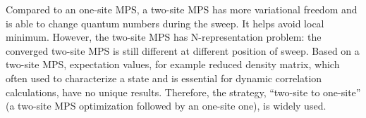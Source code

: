 Compared to an one-site MPS, a two-site MPS has more variational freedom and is able to change quantum numbers during the sweep. It helps avoid local minimum. However, the two-site MPS has N-representation problem: the converged two-site MPS is still different at different position of sweep. Based on a two-site MPS, expectation values, for example reduced density matrix, which often used to characterize a state and is essential for dynamic correlation calculations, have no unique results. 
Therefore, the strategy, ``two-site to one-site'' (a two-site MPS optimization followed by an one-site one), is widely used. 
















